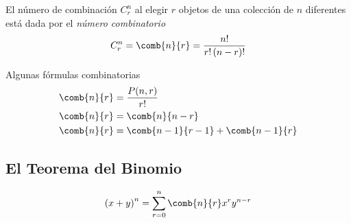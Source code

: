 El número de combinación $ C^{n}_{r} $ al elegir $r$ objetos de una colección de $n$ diferentes está dada por el \emph{número combinatorio}
\begin{align}
	\label{1.29}
	C^{n}_{r} = \comb{n}{r}=\dfrac{n!}{r!\left( n-r \right)!}
\end{align}



{Algunas fórmulas combinatorias}
\begin{align}
	\label{1.30}
	\comb{n}{r}&=\dfrac{P(n,r)}{r!} \\
	\label{1.31}
	\comb{n}{r}&=\comb{n}{n-r}\\
	\comb{n}{r}&=\comb{n-1}{r-1}+\comb{n-1}{r}
\end{align}


\subsection{El Teorema del Binomio}

\begin{teorema}
	\begin{align}
		\label{1.32}
		\left( x+y \right)^{n} = \sum_{r=0}^{n}\comb{n}{r}x^{r}y^{n-r}
	\end{align}
	
\end{teorema}





